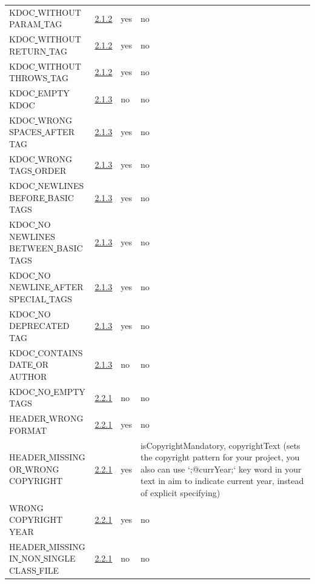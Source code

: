 \begin{longtable}{ |l|p{0.8cm}|p{0.8cm}| p{3cm} | }
KDOC\underline{ }WITHOUT\underline{ }PARAM\underline{ }TAG & \hyperref[sec:2.1.2]{2.1.2} &  yes  &   no  \\
KDOC\underline{ }WITHOUT\underline{ }RETURN\underline{ }TAG & \hyperref[sec:2.1.2]{2.1.2} &  yes  &   no  \\
KDOC\underline{ }WITHOUT\underline{ }THROWS\underline{ }TAG & \hyperref[sec:2.1.2]{2.1.2} &  yes  &   no  \\
KDOC\underline{ }EMPTY\underline{ }KDOC & \hyperref[sec:2.1.3]{2.1.3} &  no  &   no  \\
KDOC\underline{ }WRONG\underline{ }SPACES\underline{ }AFTER\underline{ }TAG & \hyperref[sec:2.1.3]{2.1.3} &  yes  &   no  \\
KDOC\underline{ }WRONG\underline{ }TAGS\underline{ }ORDER & \hyperref[sec:2.1.3]{2.1.3} &  yes  &   no  \\
KDOC\underline{ }NEWLINES\underline{ }BEFORE\underline{ }BASIC\underline{ }TAGS & \hyperref[sec:2.1.3]{2.1.3} &  yes  &   no  \\
KDOC\underline{ }NO\underline{ }NEWLINES\underline{ }BETWEEN\underline{ }BASIC\underline{ }TAGS & \hyperref[sec:2.1.3]{2.1.3} &  yes  &   no  \\
KDOC\underline{ }NO\underline{ }NEWLINE\underline{ }AFTER\underline{ }SPECIAL\underline{ }TAGS & \hyperref[sec:2.1.3]{2.1.3} &  yes  &   no  \\
KDOC\underline{ }NO\underline{ }DEPRECATED\underline{ }TAG & \hyperref[sec:2.1.3]{2.1.3} &  yes  &   no  \\
KDOC\underline{ }CONTAINS\underline{ }DATE\underline{ }OR\underline{ }AUTHOR & \hyperref[sec:2.1.3]{2.1.3} &  no  &   no  \\
KDOC\underline{ }NO\underline{ }EMPTY\underline{ }TAGS & \hyperref[sec:2.2.1]{2.2.1} &  no  &   no  \\
HEADER\underline{ }WRONG\underline{ }FORMAT & \hyperref[sec:2.2.1]{2.2.1} &  yes  &   no  \\
HEADER\underline{ }MISSING\underline{ }OR\underline{ }WRONG\underline{ }COPYRIGHT & \hyperref[sec:2.2.1]{2.2.1} &  yes  &  isCopyrightMandatory, copyrightText (sets the copyright pattern for your project, you also can use `;@currYear;` key word in your text in aim to indicate current year, instead of explicit specifying) \\
WRONG\underline{ }COPYRIGHT\underline{ }YEAR & \hyperref[sec:2.2.1]{2.2.1} &  yes  &   no  \\
HEADER\underline{ }MISSING\underline{ }IN\underline{ }NON\underline{ }SINGLE\underline{ }CLASS\underline{ }FILE & \hyperref[sec:2.2.1]{2.2.1} &  no  &   no  \\

\end{longtable}
